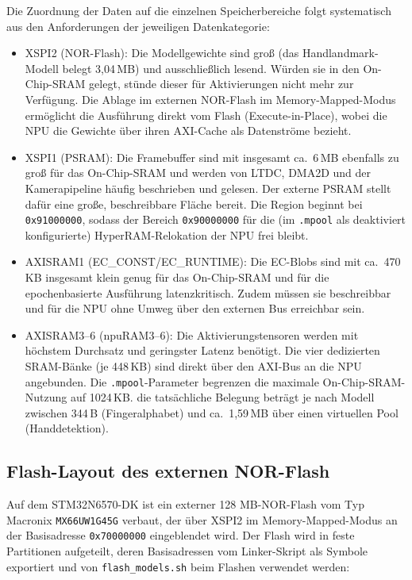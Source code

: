 Die Zuordnung der Daten auf die einzelnen \linebreak Speicherbereiche folgt
systematisch aus den Anforderungen der jeweiligen Datenkategorie:

\begin{itemize}
  \item XSPI2 (NOR-Flash): Die Modellgewichte sind groß (das Handlandmark-Modell belegt 3{,}04\,MB) und ausschließlich lesend. Würden sie in den On-Chip-SRAM gelegt, stünde dieser für Aktivierungen nicht mehr zur Verfügung. Die Ablage im externen NOR-Flash im Memory-Mapped-Modus ermöglicht die Ausführung direkt vom Flash (Execute-in-Place), wobei die NPU die Gewichte über ihren AXI-Cache als Datenströme bezieht.
  \item XSPI1 (PSRAM): Die Framebuffer sind mit insgesamt ca.\ 6\,MB ebenfalls zu groß für das On-Chip-SRAM und werden von LTDC, DMA2D und der Kamerapipeline häufig beschrieben und gelesen. Der externe PSRAM stellt dafür eine große, beschreibbare Fläche bereit. Die Region beginnt bei \texttt{0x91000000}, sodass der Bereich \texttt{0x90000000} für die (im \texttt{.mpool} als deaktiviert konfigurierte) HyperRAM-Relokation der NPU frei bleibt.
  \item AXISRAM1 (EC\_CONST/EC\_RUNTIME): Die EC-Blobs sind mit ca.\ 470\,KB insgesamt klein genug für das On-Chip-SRAM und für die epochenbasierte Ausführung latenzkritisch. Zudem müssen sie beschreibbar und für die NPU ohne Umweg über den externen Bus erreichbar sein.
  \item AXISRAM3--6 (npuRAM3--6): Die Aktivierungstensoren werden mit höchstem Durchsatz und geringster Latenz benötigt. Die vier dedizierten SRAM-Bänke (je 448\,KB) sind direkt über den AXI-Bus an die NPU angebunden. Die \texttt{.mpool}-Parameter begrenzen die maximale On-Chip-SRAM-Nutzung auf 1024\,KB. die tatsächliche Belegung beträgt je nach Modell zwischen 344\,B (Fingeralphabet) und ca.\ 1{,}59\,MB über einen virtuellen Pool (Handdetektion).
\end{itemize}

\subsection{Flash-Layout des externen NOR-Flash}\label{sec:flash-layout}

Auf dem STM32N6570-DK ist ein externer 128 MB-NOR-Flash vom Typ Macronix \linebreak
\texttt{MX66UW1G45G} verbaut, der über XSPI2 im Memory-Mapped-Modus an der
Basisadresse \linebreak \texttt{0x70000000} eingeblendet wird. Der Flash wird in
feste Partitionen aufgeteilt, deren Basisadressen vom Linker-Skript als
Symbole exportiert und von \texttt{flash\_models.sh} beim Flashen
verwendet werden:

